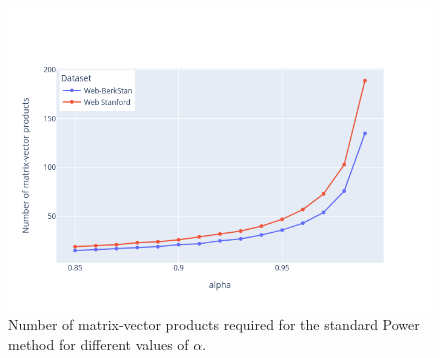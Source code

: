\begin{figure}[h!]
    \includegraphics[width=1\textwidth]{mv_alpha.png}
    \caption{Number of matrix-vector products required for the standard Power method for different values of $\alpha$.}
    \label{fig:mv}
\end{figure}


